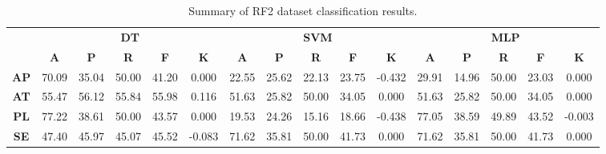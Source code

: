 \begin{landscape}
\begin{table}[htbp]
\footnotesize
\centering
\caption{Summary of RF2 dataset classification results.}
\label{tab:base_female}
\begin{tabular}{|c|c|c|c|c|c|c|c|c|c|c|c|c|c|c|c|}
\hline
\multirow{2}{*}{}	& \multicolumn{5}{c|}{\textbf{DT}}												& \multicolumn{5}{c|}{\textbf{SVM}}												& \multicolumn{5}{c|}{\textbf{MLP}}												\\ \cline{2-16} 
					& \textbf{A}	& \textbf{P}	& \textbf{R}	& \textbf{F}	& \textbf{K}	& \textbf{A}	& \textbf{P}	& \textbf{R}	& \textbf{F}	& \textbf{K}	& \textbf{A}	& \textbf{P}	& \textbf{R}	& \textbf{F}	& \textbf{K}	\\ \hline
\textbf{AP}			& 70.09			& 35.04			& 50.00			& 41.20			& 0.000			& 22.55			& 25.62			& 22.13			& 23.75			& -0.432			& 29.91			& 14.96			& 50.00			& 23.03			& 0.000			\\ \hline
\textbf{AT}			& 55.47			& 56.12			& 55.84			& 55.98			& 0.116			& 51.63			& 25.82			& 50.00			& 34.05			& 0.000			& 51.63			& 25.82			& 50.00			& 34.05			& 0.000			\\ \hline
\textbf{PL}			& 77.22			& 38.61			& 50.00			& 43.57			& 0.000			& 19.53			& 24.26			& 15.16			& 18.66			& -0.438			& 77.05			& 38.59			& 49.89			& 43.52			& -0.003			\\ \hline
\textbf{SE}			& 47.40			& 45.97			& 45.07			& 45.52			& -0.083			& 71.62			& 35.81			& 50.00			& 41.73			& 0.000			& 71.62			& 35.81			& 50.00			& 41.73			& 0.000			\\ \hline
\end{tabular}
\end{table}
\end{landscape}